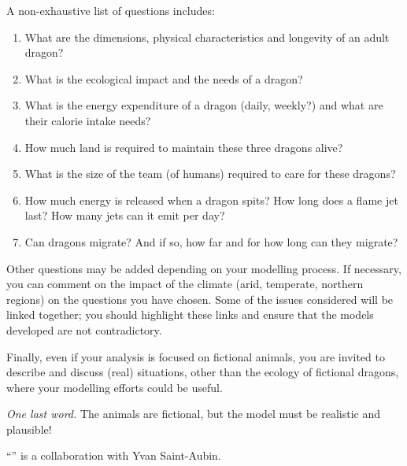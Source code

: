 A non-exhaustive list of questions includes:
\begin{enumerate}[label=\emph{\arabic*.}]
	\item What are the dimensions, physical characteristics and longevity of an adult dragon?
	\item What is the ecological impact and the needs of a dragon?
	\item What is the energy expenditure of a dragon (daily, weekly?) and what are their calorie intake needs?
	\item How much land is required to maintain these three dragons alive?
	\item What is the size of the team (of humans) required to care for these dragons?
	\item How much energy is released when a dragon spits? How long does a flame jet last? How many jets can it emit per day?
	\item Can dragons migrate? And if so, how far and for how long can they migrate?
\end{enumerate}

Other questions may be added depending on your modelling process. If necessary, you can comment on the impact of the climate (arid, temperate, northern regions) on the questions you have chosen. Some of the issues considered will be linked together; you should highlight these links and ensure that the models developed are not contradictory.

Finally, even if your analysis is focused on fictional animals, you are invited to describe and discuss (real) situations, other than the ecology of fictional dragons, where your modelling efforts could be useful.

\emph{One last word.} The animals are fictional, but the model must be realistic and plausible!



%
%



\vfill

\begin{graybox}
\hfill ``\dragonstitle'' is a collaboration with Yvan Saint-Aubin.	
\end{graybox}


\begin{noexercises}
\end{noexercises}
